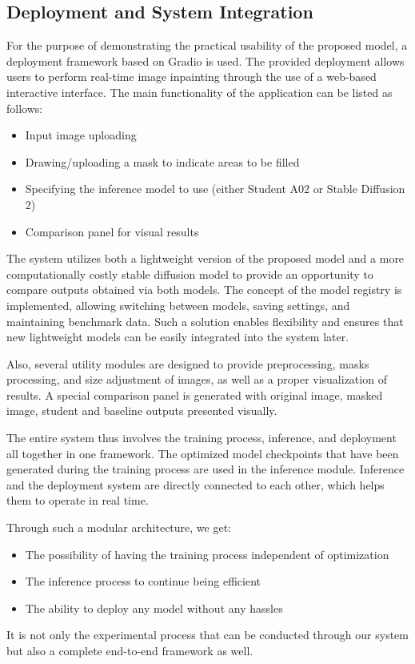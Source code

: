 \documentclass[journal]{IEEEtran}
\begin{document}
\subsection{Deployment and System Integration}
For the purpose of demonstrating the practical usability of the proposed model, a deployment framework based on Gradio is used. The provided deployment allows users to perform real-time image inpainting through the use of a web-based interactive interface. The main functionality of the application can be listed as follows:
\begin{itemize}
  \item Input image uploading
  \item Drawing/uploading a mask to indicate areas to be filled
  \item Specifying the inference model to use (either Student A02 or Stable Diffusion 2)
  \item Comparison panel for visual results
\end{itemize}
The system utilizes both a lightweight version of the proposed model and a more computationally costly stable diffusion model to provide an opportunity to compare outputs obtained via both models. The concept of the model registry is implemented, allowing switching between models, saving settings, and maintaining benchmark data. Such a solution enables flexibility and ensures that new lightweight models can be easily integrated into the system later.

Also, several utility modules are designed to provide preprocessing, masks processing, and size adjustment of images, as well as a proper visualization of results. A special comparison panel is generated with original image, masked image, student and baseline outputs presented visually.

The entire system thus involves the training process, inference, and deployment all together in one framework. The optimized model checkpoints that have been generated during the training process are used in the inference module. Inference and the deployment system are directly connected to each other, which helps them to operate in real time.

Through such a modular architecture, we get:
\begin{itemize}
  \item The possibility of having the training process independent of optimization
  \item The inference process to continue being efficient
  \item The ability to deploy any model without any hassles
\end{itemize}
It is not only the experimental process that can be conducted through our system but also a complete end-to-end framework as well.
\end{document}
